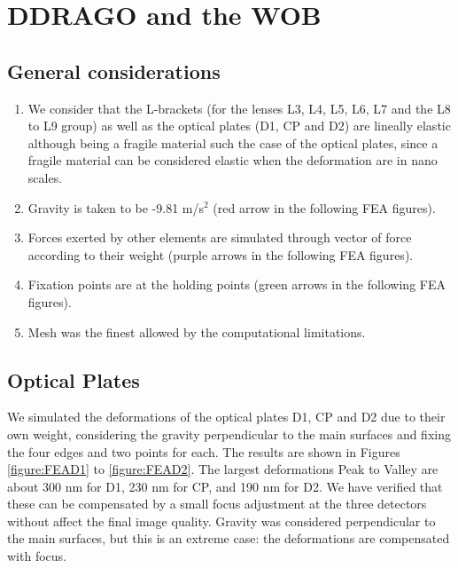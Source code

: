 \documentclass{report}
\begin{document}
\clearpage

\section{DDRAGO and the WOB}

\subsection{General considerations}

\begin{enumerate}
\item We consider that the L-brackets (for the lenses L3, L4, L5, L6, L7 and the L8 to L9 group) as well as the optical plates (D1, CP and D2) are lineally elastic although being a fragile material such the case of the optical plates, since a fragile material can be considered elastic when the deformation are in nano scales.
\item Gravity is taken to be -9.81 m/s$^2$ (red arrow in the following FEA figures).
\item Forces exerted by other elements are simulated through vector of force according to their weight (purple arrows in the following FEA figures).
\item Fixation points are at the holding points (green arrows in the following FEA figures).
\item Mesh was the finest allowed by the computational limitations.
\end{enumerate}

\subsection{Optical Plates}

We simulated the deformations of the optical plates D1, CP and D2 due to their own weight, considering the gravity perpendicular to the main surfaces and fixing the four edges and two points for each. The results are shown in Figures \ref{figure:FEAD1} to \ref{figure:FEAD2}. The largest deformations Peak to Valley are about 300 nm  for D1, 230 nm for CP, and 190 nm for D2. We have verified that these can be compensated by a small focus adjustment at the three detectors without affect the final image quality. Gravity was considered perpendicular to the main surfaces, but this is an extreme case: the deformations are compensated with focus.
\end{document}
